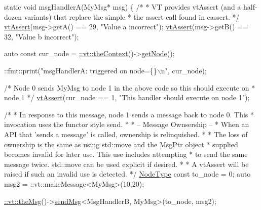 \begin{DoxyCodeInclude}
\textcolor{keyword}{static} \textcolor{keywordtype}{void} msgHandlerA(MyMsg* msg) \{
  \textcolor{comment}{/*}
\textcolor{comment}{   * VT provides vtAssert (and a half-dozen variants) that replace the simple}
\textcolor{comment}{   * the assert call found in cassert.}
\textcolor{comment}{   */}
  \hyperlink{config__assert_8h_aeddd4990a496e91a0ca5d6c16437359b}{vtAssert}(msg->getA() == 29, \textcolor{stringliteral}{"Value a incorrect"});
  \hyperlink{config__assert_8h_aeddd4990a496e91a0ca5d6c16437359b}{vtAssert}(msg->getB() == 32, \textcolor{stringliteral}{"Value b incorrect"});

  \textcolor{keyword}{auto} \textcolor{keyword}{const} cur\_node = \hyperlink{namespacevt_a26551fe0e6e6a1371111df5b12c7e92c}{::vt::theContext}()->\hyperlink{structvt_1_1ctx_1_1_context_a0d52c263ce8516546a67443d9a86fa5f}{getNode}();

  ::fmt::print(\textcolor{stringliteral}{"msgHandlerA: triggered on node=\{\}\(\backslash\)n"}, cur\_node);

  \textcolor{comment}{/* Node 0 sends MyMsg to node 1 in the above code so this should execute on}
\textcolor{comment}{   * node 1 */}
  \hyperlink{config__assert_8h_aeddd4990a496e91a0ca5d6c16437359b}{vtAssert}(cur\_node == 1, \textcolor{stringliteral}{"This handler should execute on node 1"});

  \textcolor{comment}{/*}
\textcolor{comment}{   * In response to this message, node 1 sends a message back to node 0. This}
\textcolor{comment}{   * invocation uses the functor style send.}
\textcolor{comment}{   *}
\textcolor{comment}{   * -- Message Ownsership --}
\textcolor{comment}{   * When an API that 'sends a message' is called, ownership is relinquished.}
\textcolor{comment}{   *}
\textcolor{comment}{   * The loss of ownership is the same as using std::move and the MsgPtr object}
\textcolor{comment}{   * supplied becomes invalid for later use. This use includes attempting}
\textcolor{comment}{   * to send the same message twice. std::move can be used explicit if desired.}
\textcolor{comment}{   *}
\textcolor{comment}{   * A vtAssert will be raised if such an invalid use is detected.}
\textcolor{comment}{   */}
  \hyperlink{namespacevt_a866da9d0efc19c0a1ce79e9e492f47e2}{NodeType} \textcolor{keyword}{const} to\_node = 0;
  \textcolor{keyword}{auto} msg2 = ::vt::makeMessage<MyMsg>(10,20);

  \hyperlink{namespacevt_aeafd31f866aeb4dc6fc2f6ee97136350}{::vt::theMsg}()->\hyperlink{group__preregister_ga0162a39473e7f9b490a79a7983d949ac}{sendMsg}<MsgHandlerB, MyMsg>(to\_node, msg2);


\end{DoxyCodeInclude}
